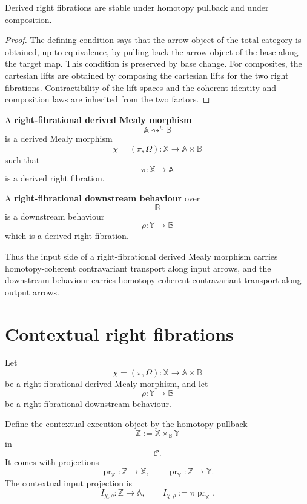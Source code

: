 \begin{lemma}
\label{lem:derived-poly-right-fibration-stability}
Derived right fibrations are stable under homotopy pullback and under
composition.
\end{lemma}

\begin{proof}
The defining condition says that the arrow object of the total category is
obtained, up to equivalence, by pulling back the arrow object of the base along
the target map.  This condition is preserved by base change.  For composites,
the cartesian lifts are obtained by composing the cartesian lifts for the two
right fibrations.  Contractibility of the lift spaces and the coherent identity
and composition laws are inherited from the two factors.
\end{proof}

\begin{definition}
\label{def:derived-poly-right-fibrational-mealy-data}
A \textbf{right-fibrational derived Mealy morphism}
\[
\mathbb A\rightsquigarrow^h\mathbb B
\]
is a derived Mealy morphism
\[
\chi=(\pi,\Omega):
\mathbb X\to\mathbb A\times\mathbb B
\]
such that
\[
\pi:\mathbb X\to\mathbb A
\]
is a derived right fibration.

A \textbf{right-fibrational downstream behaviour} over
\[
\mathbb B
\]
is a downstream behaviour
\[
\rho:\mathbb Y\to\mathbb B
\]
which is a derived right fibration.
\end{definition}

Thus the input side of a right-fibrational derived Mealy morphism carries
homotopy-coherent contravariant transport along input arrows, and the
downstream behaviour carries homotopy-coherent contravariant transport along
output arrows.

\section{Contextual right fibrations}
\label{sec:derived-poly-contextual-right-fibration}

Let
\[
\chi=(\pi,\Omega):\mathbb X\to\mathbb A\times\mathbb B
\]
be a right-fibrational derived Mealy morphism, and let
\[
\rho:\mathbb Y\to\mathbb B
\]
be a right-fibrational downstream behaviour.

Define the contextual execution object by the homotopy pullback
\[
\mathbb Z
:=
\mathbb X\times_{\mathbb B}\mathbb Y
\]
in
\[
\mathcal C.
\]
It comes with projections
\[
\operatorname{pr}_{\mathbb X}:\mathbb Z\to\mathbb X,
\qquad
\operatorname{pr}_{\mathbb Y}:\mathbb Z\to\mathbb Y.
\]
The contextual input projection is
\[
I_{\chi,\rho}:
\mathbb Z\to\mathbb A,
\qquad
I_{\chi,\rho}:=\pi\operatorname{pr}_{\mathbb X}.
\]

